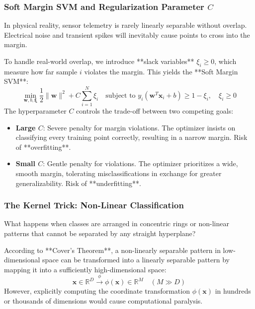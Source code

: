 \subsubsection{Soft Margin SVM and Regularization Parameter $C$}
In physical reality, sensor telemetry is rarely linearly separable without overlap. Electrical noise and transient spikes will inevitably cause points to cross into the margin.

To handle real-world overlap, we introduce **slack variables** $\xi_i \ge 0$, which measure how far sample $i$ violates the margin. This yields the **Soft Margin SVM**:
\begin{equation}
\min_{\mathbf{w}, b, \boldsymbol{\xi}} \frac{1}{2} \|\mathbf{w}\|^2 + C \sum_{i=1}^{N} \xi_i \quad \text{subject to } y_i (\mathbf{w}^T \mathbf{x}_i + b) \ge 1 - \xi_i, \quad \xi_i \ge 0\label{eq:svm_soft_optimization}
\end{equation}
The hyperparameter $C$ controls the trade-off between two competing goals:
\begin{itemize}
    \item \textbf{Large $C$}: Severe penalty for margin violations. The optimizer insists on classifying every training point correctly, resulting in a narrow margin. Risk of **overfitting**.
    \item \textbf{Small $C$}: Gentle penalty for violations. The optimizer prioritizes a wide, smooth margin, tolerating misclassifications in exchange for greater generalizability. Risk of **underfitting**.
\end{itemize}

\subsubsection{The Kernel Trick: Non-Linear Classification}
What happens when classes are arranged in concentric rings or non-linear patterns that cannot be separated by any straight hyperplane?

According to **Cover's Theorem**, a non-linearly separable pattern in low-dimensional space can be transformed into a linearly separable pattern by mapping it into a sufficiently high-dimensional space:
\begin{equation}
\mathbf{x} \in \mathbb{R}^D \xrightarrow{\phi} \phi(\mathbf{x}) \in \mathbb{R}^M \quad (M \gg D)
\end{equation}
However, explicitly computing the coordinate transformation $\phi(\mathbf{x})$ in hundreds or thousands of dimensions would cause computational paralysis.

